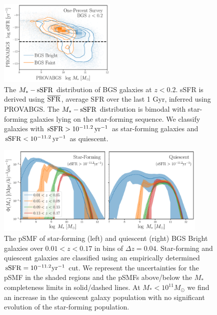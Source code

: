 \begin{figure}
\begin{center}
    \includegraphics[width=0.5\textwidth]{figs/sfq.pdf} 
    \caption{
        The $M_*-{\rm sSFR}$ distribution of BGS galaxies at $z < 0.2$. 
        sSFR is derived using $\overline{\rm SFR}$, average SFR over the last 1
        Gyr, inferred using PROVABGS. 
        The $M_*-{\rm sSFR}$ distribution is bimodal with star-forming galaxies
        lying on the star-forming sequence.
        We classify galaxies with ${\rm sSFR} > 10^{-11.2}\,{\rm yr}^{-1}$ as
        star-forming galaxies and ${\rm sSFR} < 10^{-11.2}\,{\rm yr}^{-1}$ as
        quiescent. 
    }\label{fig:sfq}
\end{center}
\end{figure}


\begin{figure}
\begin{center}
    \includegraphics[width=0.9\textwidth]{figs/psmf_bgs_bright_sfq.pdf} 
    \caption{
        The pSMF of star-forming (left) and quiescent (right) BGS Bright
        galaxies over $0.01 < z < 0.17$ in bins of $\Delta z = 0.04$. 
        Star-forming and quiescent galaxies are classified using an empirically
        determined ${\rm sSFR} = 10^{-11.2}{\rm yr}^{-1}$ cut. 
        We represent the uncertainties for the pSMF in the shaded regions and 
        the pSMFs above/below the $M_*$ completeness limits in solid/dashed
        lines.
        At $M_* < 10^{11}M_\odot$ we find an increase in the quiescent galaxy
        population with no significant evolution of the star-forming population.
    }\label{fig:sfqsmf}
\end{center}
\end{figure}


